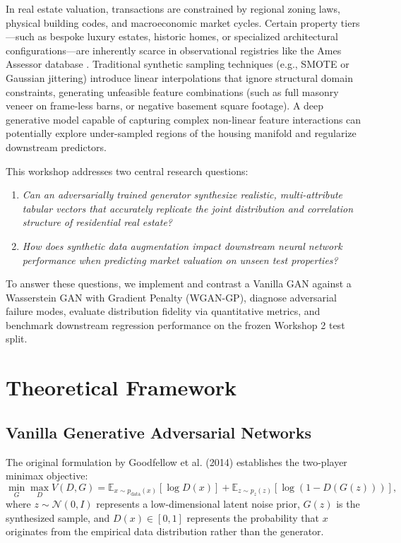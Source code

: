 \documentclass[11pt,letterpaper]{article}
\begin{document}
In real estate valuation, transactions are constrained by regional zoning laws, physical building codes, and macroeconomic market cycles. Certain property tiers---such as bespoke luxury estates, historic homes, or specialized architectural configurations---are inherently scarce in observational registries like the Ames Assessor database \cite{decock2011}. Traditional synthetic sampling techniques (e.g., SMOTE or Gaussian jittering) introduce linear interpolations that ignore structural domain constraints, generating unfeasible feature combinations (such as full masonry veneer on frame-less barns, or negative basement square footage). A deep generative model capable of capturing complex non-linear feature interactions can potentially explore under-sampled regions of the housing manifold and regularize downstream predictors.

This workshop addresses two central research questions:
\begin{enumerate}
    \item \textit{Can an adversarially trained generator synthesize realistic, multi-attribute tabular vectors that accurately replicate the joint distribution and correlation structure of residential real estate?}
    \item \textit{How does synthetic data augmentation impact downstream neural network performance when predicting market valuation on unseen test properties?}
\end{enumerate}

To answer these questions, we implement and contrast a Vanilla GAN against a Wasserstein GAN with Gradient Penalty (WGAN-GP), diagnose adversarial failure modes, evaluate distribution fidelity via quantitative metrics, and benchmark downstream regression performance on the frozen Workshop 2 test split.

\section{Theoretical Framework}

\subsection{Vanilla Generative Adversarial Networks}
The original formulation by Goodfellow et al. (2014) \cite{goodfellow2014} establishes the two-player minimax objective:
\begin{equation}
\min_G \max_D V(D, G) = \mathbb{E}_{x \sim p_{\text{data}}(x)}[\log D(x)] + \mathbb{E}_{z \sim p_z(z)}[\log(1 - D(G(z)))],
\end{equation}
where $z \sim \mathcal{N}(0, I)$ represents a low-dimensional latent noise prior, $G(z)$ is the synthesized sample, and $D(x) \in [0, 1]$ represents the probability that $x$ originates from the empirical data distribution rather than the generator.
\end{document}
